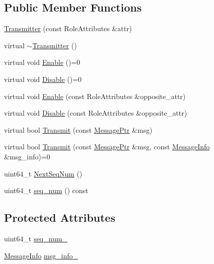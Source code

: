 \subsection*{Public Member Functions}
\begin{DoxyCompactItemize}
\item 
\hyperlink{classapollo_1_1cyber_1_1transport_1_1Transmitter_a29e1b4439830ff929defddf22c855e65}{Transmitter} (const Role\-Attributes \&attr)
\item 
virtual \hyperlink{classapollo_1_1cyber_1_1transport_1_1Transmitter_a9394eae94d32def86c0a4dc623c97800}{$\sim$\-Transmitter} ()
\item 
virtual void \hyperlink{classapollo_1_1cyber_1_1transport_1_1Transmitter_aa4fd1ee72a6ba751226570e4ff54920d}{Enable} ()=0
\item 
virtual void \hyperlink{classapollo_1_1cyber_1_1transport_1_1Transmitter_a24bc426b201239fceff22535351a1903}{Disable} ()=0
\item 
virtual void \hyperlink{classapollo_1_1cyber_1_1transport_1_1Transmitter_a4217ea4d53f13ef59252feea3e621397}{Enable} (const Role\-Attributes \&opposite\-\_\-attr)
\item 
virtual void \hyperlink{classapollo_1_1cyber_1_1transport_1_1Transmitter_ad467f468e0a7e078d36cb294c838377f}{Disable} (const Role\-Attributes \&opposite\-\_\-attr)
\item 
virtual bool \hyperlink{classapollo_1_1cyber_1_1transport_1_1Transmitter_a63e433e62701d173f0ceffb41c028b9f}{Transmit} (const \hyperlink{classapollo_1_1cyber_1_1transport_1_1Transmitter_a1c068aab2db2d0a5ba7a26ed228b7c65}{Message\-Ptr} \&msg)
\item 
virtual bool \hyperlink{classapollo_1_1cyber_1_1transport_1_1Transmitter_af3a4b7fb0a6dcc1bd00437c121b18e19}{Transmit} (const \hyperlink{classapollo_1_1cyber_1_1transport_1_1Transmitter_a1c068aab2db2d0a5ba7a26ed228b7c65}{Message\-Ptr} \&msg, const \hyperlink{classapollo_1_1cyber_1_1transport_1_1MessageInfo}{Message\-Info} \&msg\-\_\-info)=0
\item 
uint64\-\_\-t \hyperlink{classapollo_1_1cyber_1_1transport_1_1Transmitter_a3a20f5e40d1a28ed1269eb78ea4249b3}{Next\-Seq\-Num} ()
\item 
uint64\-\_\-t \hyperlink{classapollo_1_1cyber_1_1transport_1_1Transmitter_afe57d8a5a4de892a837c4eab055e222c}{seq\-\_\-num} () const 
\end{DoxyCompactItemize}
\subsection*{Protected Attributes}
\begin{DoxyCompactItemize}
\item 
uint64\-\_\-t \hyperlink{classapollo_1_1cyber_1_1transport_1_1Transmitter_a4250ef0529279ee67dfa47ef4b9e2e3c}{seq\-\_\-num\-\_\-}
\item 
\hyperlink{classapollo_1_1cyber_1_1transport_1_1MessageInfo}{Message\-Info} \hyperlink{classapollo_1_1cyber_1_1transport_1_1Transmitter_a21d38f3801379a33ed3d032b5c092763}{msg\-\_\-info\-\_\-}
\end{DoxyCompactItemize}


